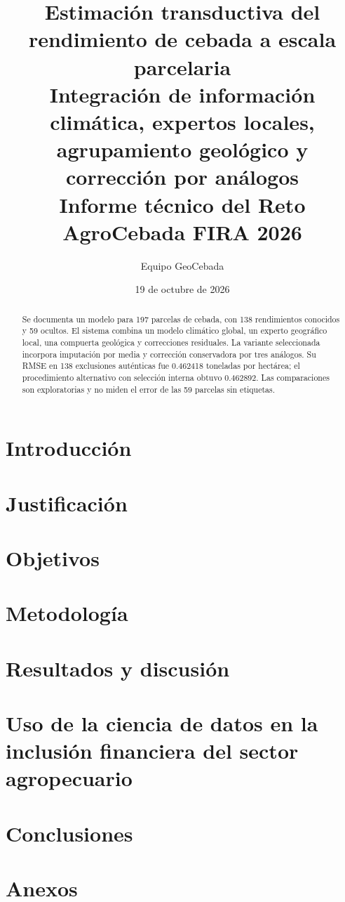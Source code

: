 \documentclass[11pt,a4paper]{article}
\title{\textbf{Estimación transductiva del rendimiento de cebada a escala parcelaria}\\[0.4em]\large Integración de información climática, expertos locales, agrupamiento geológico y corrección por análogos\\[0.5em]\normalsize Informe técnico del Reto AgroCebada FIRA 2026}
\author{Equipo GeoCebada}
\date{19 de octubre de 2026}
\begin{document}
\maketitle
\begin{abstract}
Se documenta un modelo para 197 parcelas de cebada, con 138 rendimientos conocidos y 59 ocultos. El sistema combina un modelo climático global, un experto geográfico local, una compuerta geológica y correcciones residuales. La variante seleccionada incorpora imputación por media y corrección conservadora por tres análogos. Su RMSE en 138 exclusiones auténticas fue 0.462418 toneladas por hectárea; el procedimiento alternativo con selección interna obtuvo 0.462892. Las comparaciones son exploratorias y no miden el error de las 59 parcelas sin etiquetas.
\end{abstract}
\section{Introducción}
\section{Justificación}
\section{Objetivos}
\section{Metodología}
\section{Resultados y discusión}
\section{Uso de la ciencia de datos en la inclusión financiera del sector agropecuario}
\section{Conclusiones}
\clearpage
\nocite{*}
\printbibliography[heading=bibintoc,title={Bibliografía}]
\clearpage
\appendix\section{Anexos}
\end{document}
